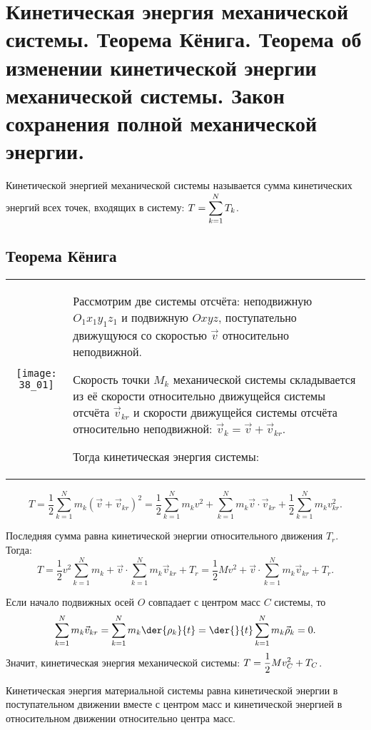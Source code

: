 \chapter{Кинетическая энергия механической системы. Теорема Кёнига. Теорема об
изменении кинетической энергии механической системы. Закон сохранения
полной механической энергии.}

Кинетической энергией механической системы называется сумма кинетических энергий
всех точек, входящих в систему: \( \displaystyle T = \sum_{k=1}^N T_k \).

\section{Теорема Кёнига}
\begin{table}[h!]
\begin{tabular}{C{.4}m{.55\textwidth}}
    \texttt{[image: 38\_01]} &
    Рассмотрим две системы отсчёта: неподвижную \( O_1x_1y_1z_1 \) и подвижную
    \( Oxyz \), поступательно движущуюся со скоростью \( \vec{v} \) относительно
    неподвижной.

    Скорость точки \( M_k \) механической системы складывается из её скорости
    относительно движущейся системы отсчёта \( \vec{v}_{kr} \) и скорости
    движущейся системы отсчёта относительно неподвижной:
    \( \vec{v}_k = \vec{v} + \vec{v}_{kr} \).

Тогда кинетическая энергия системы:
\end{tabular}
\end{table}
\vspace*{-2.5em}
\[
    T = \frac{1}{2}\sum_{k=1}^N m_k(\vec{v} + \vec{v}_{kr})^2 = \frac{1}{2}
    \sum_{k=1}^N m_k v^2 + \sum_{k=1}^N m_k\vec{v}\cdot\vec{v}_{kr} +
    \frac{1}{2}\sum_{k=1}^N m_k v_{kr}^2.
\]

Последняя сумма равна кинетической энергии относительного движения \( T_r \). Тогда:
\[
    T = \frac{1}{2}v^2\sum_{k=1}^N m_k + \vec{v}\cdot\sum_{k=1}^Nm_k\vec{v}_{kr}
    + T_r = \frac{1}{2}Mv^2 + \vec{v}\cdot\sum_{k=1}^N m_k\vec{v}_{kr} + T_r.
\]

Если начало подвижных осей \( O \) совпадает с центром масс \( C \) системы, то
\[
    \sum_{k=1}^N m_k\vec{v}_{kr} = \sum_{k=1}^N m_k\der{\rho_k}{t} = \der{}{t}
    \sum_{k=1}^N m_k\vec{\rho}_k = 0.
\]
Значит, кинетическая энергия механической системы:
\( \displaystyle T = \frac{1}{2}Mv_C^2 + T_C \).

Кинетическая энергия материальной системы равна кинетической энергии в
поступательном движении вместе с центром масс и кинетической энергией в
относительном движении относительно центра масс.

